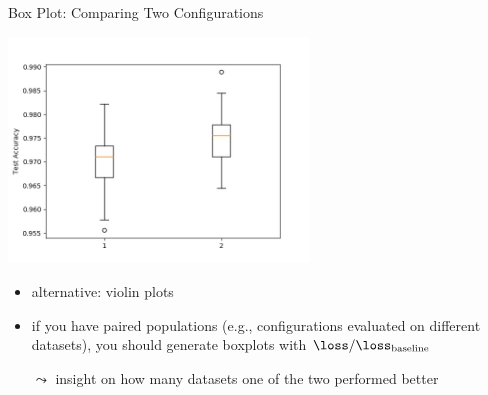 \begin{frame}[c]{Box Plot: Comparing Two Configurations}

\centering
\includegraphics[width=0.6\textwidth]{scripts/mlp12_boxplot.jpg}

\begin{itemize}
	\item alternative: violin plots
	\pause
	\smallskip
	\item if you have paired populations (e.g., configurations evaluated on different datasets),
			you should generate boxplots with $\loss / \loss_{\text{baseline}}$ 
	\item[$\leadsto$] insight on how many datasets one of the two performed better
\end{itemize}
	

\end{frame}
